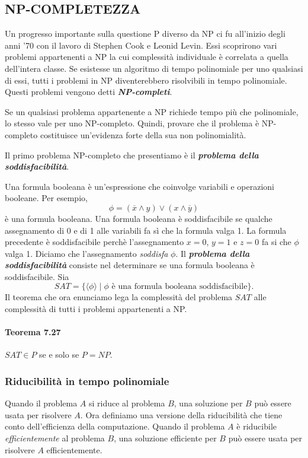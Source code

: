 \documentclass{article}
\begin{document}
\subsection{NP-COMPLETEZZA}
Un progresso importante sulla questione P diverso da NP ci fu all'inizio degli anni '70 con il lavoro di Stephen Cook e Leonid Levin. 
Essi scoprirono vari problemi appartenenti a NP la cui complessità individuale è correlata a quella dell'intera classe. 
Se esistesse un algoritmo di tempo polinomiale per uno qualsiasi di essi, tutti i problemi in NP diventerebbero risolvibili in tempo polinomiale. 
Questi problemi vengono detti \textit{\textbf{NP-completi}}.

Se un qualsiasi problema appartenente a NP richiede tempo più che polinomiale, lo stesso vale per uno NP-completo.
Quindi, provare che il problema è NP-completo costituisce un'evidenza forte della sua non polinomialità. 

Il primo problema NP-completo che presentiamo è il \textbf{\textit{problema della soddisfacibilità}}.

Una formula booleana è un'espressione che coinvolge variabili e operazioni booleane. 
Per esempio,
$$ 
\phi = (\overline{x} \land y) \lor (x \land \overline{y})
$$
è una formula booleana. Una formula booleana è soddisfacibile se qualche assegnamento di 0 e di 1 alle variabili fa sì che la formula valga 1.
La formula precedente è soddisfacibile perchè l'assegnamento $x = 0$, $y = 1$ e $z = 0$ fa si che $\phi$ valga 1.
Diciamo che l'assegnamento \textit{soddisfa} $\phi$.
Il \textit{\textbf{problema della soddisfacibilità}} consiste nel determinare se una formula booleana è soddisfacibile.
Sia 
$$
SAT = \{ \langle \phi \rangle \mid \phi \text{ è una formula booleana soddisfacibile} \}.
$$
Il teorema che ora enunciamo lega la complessità del problema $SAT$ alle complessità di tutti i problemi appartenenti a NP.
\paragraph{Teorema 7.27}
\label{teorema-7.27}
\vspace{1em}
\text{}
\newline
$SAT \in P$ se e solo se $P = NP$.

\subsubsection{Riducibilità in tempo polinomiale}
Quando il problema $A$ si riduce al problema $B$, una soluzione per $B$ può essere usata per risolvere $A$. 
Ora definiamo una versione della riducibilità che tiene conto dell'efficienza della computazione. 
Quando il problema $A$ è riducibile \textit{efficientemente} al problema $B$, una soluzione efficiente per $B$ può essere usata per risolvere $A$ efficientemente.
\end{document}
